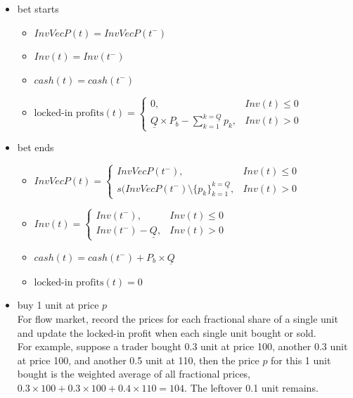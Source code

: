 \documentclass{article}
\begin{document}
\begin{itemize}
    \item bet starts
    \begin{itemize}
        \item $InvVecP(t) = InvVecP(t^-)$
        \item $Inv(t) = Inv(t^-)$
        \item $cash(t) = cash(t^-)$
        \item $\text{locked-in profits}(t) = 
        \begin{cases} 
            0, & Inv(t) \leq 0 \\
            \underline{Q} \times P_b - \sum^{k = \underline{Q}}_{k = 1} p_k, & Inv(t) > 0 
        \end{cases}$
    \end{itemize}
    \item bet ends
    \begin{itemize}
        \item $InvVecP(t) = 
        \begin{cases}
            InvVecP(t^-), & Inv(t) \leq 0 \\
            s(InvVecP(t^-) \setminus \{p_k\}_{k = 1}^{k = \underline{Q}}, & Inv(t) > 0 
        \end{cases}$
        \item $Inv(t) = 
        \begin{cases}
            Inv(t^-), & Inv(t) \leq 0 \\
            Inv(t^-) - \underline{Q}, & Inv(t) > 0
        \end{cases}$
        \item $cash(t) = cash(t^-) + P_b \times \underline{Q}$
        \item $\text{locked-in profits}(t) = 0$
    \end{itemize}
    \item buy 1 unit at price $p$ \\
    For flow market, record the prices for each fractional share of a single unit and update the locked-in profit when each single unit bought or sold. \\
    For example, suppose a trader bought 0.3 unit at price 100, another 0.3 unit at price 100, and another 0.5 unit at 110, then the price $p$ for this 1 unit bought is the weighted average of all fractional prices, $0.3 \times 100 + 0.3 \times 100 + 0.4 \times 110 = 104$. The leftover 0.1 unit remains. 
\end{itemize}
\end{document}
